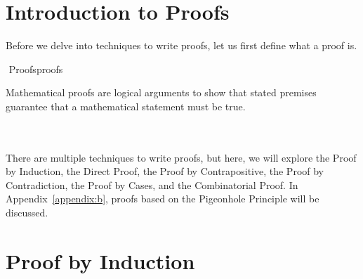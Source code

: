\section{Introduction to Proofs}
    
    Before we delve into techniques to write proofs, let us first define what a proof is. 
    \begin{definition}{\Stop\,\,Proofs}{proofs}
    
        Mathematical proofs are logical arguments to show that stated premises guarantee that a mathematical statement must be true.
    
    \end{definition}
    \vphantom
    \\
    \\
    There are multiple techniques to write proofs, but here, we will explore the Proof by Induction, the Direct Proof, the Proof by Contrapositive, the Proof by Contradiction, the Proof by Cases, and the Combinatorial Proof. In Appendix~\ref{appendix:b}, proofs based on the Pigeonhole Principle will be discussed.
    
\section{Proof by Induction}

